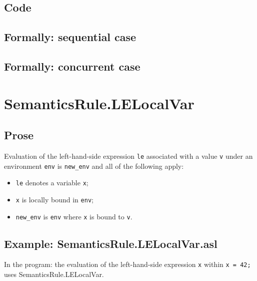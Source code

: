 \documentclass{book}
\begin{document}
  \subsection{Code}

\begin{emptyformal}
  \subsection{Formally: sequential case}

  \subsection{Formally: concurrent case}
\end{emptyformal}


\section{SemanticsRule.LELocalVar \label{sec:SemanticsRule.LELocalVar}}

    \subsection{Prose}
    Evaluation of the left-hand-side expression \texttt{le} associated with a
value \texttt{v} under an environment \texttt{env} is \texttt{new\_env} and all
of the following apply:
    \begin{itemize}
    \item \texttt{le} denotes a variable \texttt{x};
    \item \texttt{x} is locally bound in \texttt{env};
    \item \texttt{new\_env} is \texttt{env} where \texttt{x} is bound to \texttt{v}.
    \end{itemize}

    \subsection{Example: SemanticsRule.LELocalVar.asl}
    In the program:
    the evaluation of the left-hand-side expression \texttt{x} within \texttt{x = 42;} uses SemanticsRule.LELocalVar.
\end{document}
